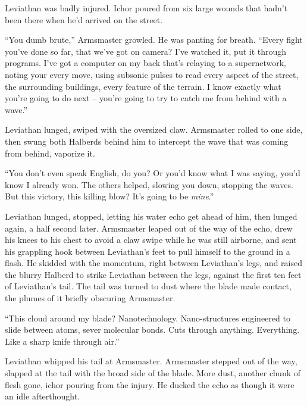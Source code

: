 Leviathan was badly injured.  Ichor poured from six large wounds that hadn't been there when he'd arrived on the street.



``You dumb brute,'' Armsmaster growled.  He was panting for breath.  ``Every fight you've done so far, that we've got on camera?  I've watched it, put it through programs.  I've got a computer on my back that's relaying to a supernetwork, noting your every move, using subsonic pulses to read every aspect of the street, the surrounding buildings, every feature of the terrain.  I know exactly what you're going to do next – you're going to try to catch me from behind with a wave.''



Leviathan lunged, swiped with the oversized claw.  Armsmaster rolled to one side, then swung both Halberds behind him to intercept the wave that was coming from behind, vaporize it.



``You don't even speak English, do you?  Or you'd know what I was saying, you'd know I already won.  The others helped, slowing you down, stopping the waves.  But this victory, this killing blow?  It's going to be \emph{mine}.''



Leviathan lunged, stopped, letting his water echo get ahead of him, then lunged again, a half second later.  Armsmaster leaped out of the way of the echo, drew his knees to his chest to avoid a claw swipe while he was still airborne, and sent his grappling hook between Leviathan's feet to pull himself to the ground in a flash.  He skidded with the momentum, right between Leviathan's legs, and raised the blurry Halberd to strike Leviathan between the legs, against the first ten feet of Leviathan's tail.  The tail was turned to dust where the blade made contact, the plumes of it briefly obscuring Armsmaster.



``This cloud around my blade?  Nanotechnology.  Nano-structures engineered to slide between atoms, sever molecular bonds.  Cuts through anything.  Everything.  Like a sharp knife through air.''



Leviathan whipped his tail at Armsmaster.  Armsmaster stepped out of the way, slapped at the tail with the broad side of the blade.  More dust, another chunk of flesh gone, ichor pouring from the injury.  He ducked the echo as though it were an idle afterthought.



